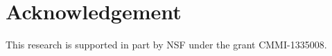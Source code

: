 \documentclass[journal]{new-aiaa}
\begin{document}

\section{Acknowledgement}
This research is supported in part by NSF under the grant CMMI-1335008.


\end{document}
